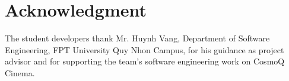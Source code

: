 \documentclass[conference]{IEEEtran}
\begin{document}
\section*{Acknowledgment}
The student developers thank Mr. Huynh Vang, Department of Software Engineering,
FPT University Quy Nhon Campus, for his guidance as project advisor and for
supporting the team's software engineering work on CosmoQ Cinema.
\balance


\end{document}
